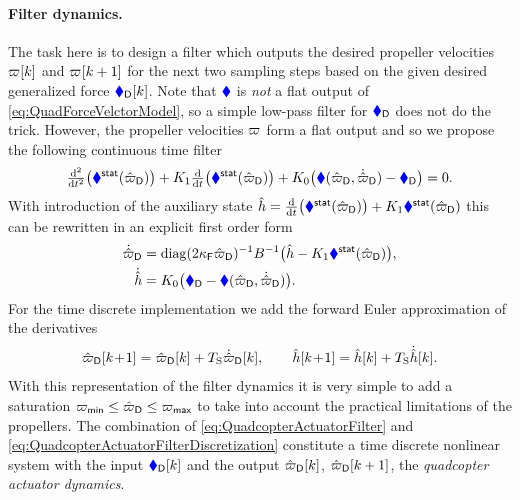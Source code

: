 \paragraph{Filter dynamics.}
The task here is to design a filter which outputs the desired propeller velocities $\PropVel[][k]$ and $\PropVel[][k+1]$ for the next two sampling steps based on the given desired generalized force $\genForceQuadD[k]$.
Note that $\genForceQuad$ is \textit{not} a flat output of \eqref{eq:QuadForceVelctorModel}, so a simple low-pass filter for $\genForceQuadD$ does not do the trick.
However, the propeller velocities $\PropVel$ form a flat output and so we propose the following continuous time filter
\begin{align}\label{eq:QuadActuatorFilterDesign}
 \tfrac{\d^2}{\d t^2} \big(\genForceQuadStat(\PropVelDF)\big) + K_1 \tfrac{\d}{\d t} \big(\genForceQuadStat(\PropVelDF)\big) + K_0 \big( \genForceQuad(\PropVelDF,\PropVelDFd) - \genForceQuadD \big) = 0
 .
\end{align}
With introduction of the auxiliary state $\hat{h} = \tfrac{\d}{\d t} \big(\genForceQuadStat(\PropVelDF)\big) + K_1 \genForceQuadStat(\PropVelDF)$ this can be rewritten in an explicit first order form
\begin{subequations}\label{eq:QuadcopterActuatorFilter}
\begin{align}
 \PropVelDFd &= \diag(2 \kappaF \PropVelDF)^{-1} B^{-1} \big( \hat{h} - K_1 \genForceQuadStat(\PropVelDF) \big),
\\
 \dot{\hat{h}} &= K_0 \big( \genForceQuadD - \genForceQuad(\PropVelDF,\PropVelDFd) \big).
\end{align}
\end{subequations}
For the time discrete implementation we add the forward Euler approximation of the derivatives
\begin{align}\label{eq:QuadcopterActuatorFilterDiscretization}
 \PropVelDF[][k\!+\!1] = \PropVelDF[][k] + \Ts \PropVelDFd[][k],
\qquad
 \hat{h}[k\!+\!1] = \hat{h}[k] + \Ts \dot{\hat{h}}[k].
\end{align}
With this representation of the filter dynamics it is very simple to add a saturation $\PropVelMin \leq \PropVelDF \leq \PropVelMax$ to take into account the practical limitations of the propellers.
The combination of \eqref{eq:QuadcopterActuatorFilter} and \eqref{eq:QuadcopterActuatorFilterDiscretization} constitute a time discrete nonlinear system with the input $\genForceQuadD[k]$ and the output $\PropVelDF[][k]$, $\PropVelDF[][k+1]$, the \textit{quadcopter actuator dynamics}.  

